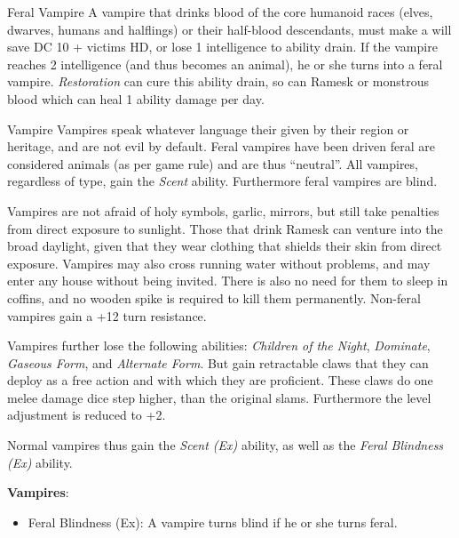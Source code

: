 \begin{35e}{Feral Vampire}
  A vampire that drinks blood of the core humanoid races (elves, dwarves,
  humans and halflings) or their half-blood descendants, must make a will save
  DC 10 + victims HD, or lose 1 intelligence to ability drain. If the vampire
  reaches 2 intelligence (and thus becomes an animal), he or she turns into a
  feral vampire. \emph{Restoration} can cure this ability drain, so can Ramesk
  or monstrous blood which can heal 1 ability damage per day.
\end{35e}

\begin{35e}{Vampire}
  Vampires speak whatever language their given by their region or heritage,
  and are not evil by default. Feral vampires have been driven feral are
  considered animals (as per game rule) and are thus ``neutral''. All
  vampires, regardless of type, gain the \emph{Scent} ability. Furthermore
  feral vampires are blind.

  Vampires are not afraid of holy symbols, garlic, mirrors, but still take
  penalties from direct exposure to sunlight. Those that drink Ramesk can
  venture into the broad daylight, given that they wear clothing that shields
  their skin from direct exposure. Vampires may also cross running water
  without problems, and may enter any house without being invited. There is
  also no need for them to sleep in coffins, and no wooden spike is required
  to kill them permanently. Non-feral vampires gain a +12 turn resistance.

  Vampires further lose the following abilities: \emph{Children of the Night},
  \emph{Dominate}, \emph{Gaseous Form}, and \emph{Alternate Form}. But gain
  retractable claws that they can deploy as a free action and with which they
  are proficient. These claws do one melee damage dice step higher, than the
  original slams. Furthermore the level adjustment is reduced to +2.

  Normal vampires thus gain the \emph{Scent (Ex)} ability, as well as the
  \emph{Feral Blindness (Ex)} ability.

  \textbf{Vampires}:\\
  \begin{itemize}[noitemsep]
    \item Feral Blindness (Ex): A vampire turns blind if he or she turns feral.
  \end{itemize}
\end{35e}
